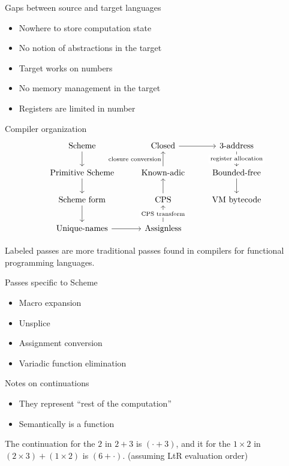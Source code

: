 \documentclass{beamer}
\begin{document}
\begin{frame}{Gaps between source and target languages}
  \begin{itemize}
  \item Nowhere to store computation state
  \item No notion of abstractions in the target
  \item Target works on numbers
  \item No memory management in the target
  \item Registers are limited in number
  \end{itemize}
\end{frame}

\begin{frame}[fragile]{Compiler organization}
  \[\begin{tikzcd}
\text{Scheme} \arrow[d]           & \text{Closed} \arrow[r]      & \text{3-address} \arrow[d, "\text{register allocation}" description]      \\
\text{Primitive Scheme} \arrow[d] & \text{Known-adic} \arrow[u, "\text{closure conversion}"]  & \text{Bounded-free} \arrow[d] \\
\text{Scheme form} \arrow[d]      & \text{CPS} \arrow[u]         & \text{VM bytecode}            \\
\text{Unique-names} \arrow[r]     & \text{Assignless} \arrow[u, "\text{CPS transform}" description] &                              
\end{tikzcd}\]

Labeled passes are more traditional passes found in compilers for functional programming languages.
\end{frame}

\begin{frame}{Passes specific to Scheme}
  \begin{itemize}
  \item Macro expansion
  \item Unsplice
  \item Assignment conversion
  \item Variadic function elimination
  \end{itemize}
\end{frame}

\begin{frame}{Notes on continuations}
  \begin{itemize}
  \item They represent ``rest of the computation''
  \item Semantically is a function
  \end{itemize}

  \begin{example}
    The continuation for the $2$ in $2+3$ is $(\cdot+3)$, and it for the $1\times2$ in $(2\times3)+(1\times2)$ is $(6+\cdot)$. (assuming LtR evaluation order)
  \end{example}
\end{frame}
\end{document}

